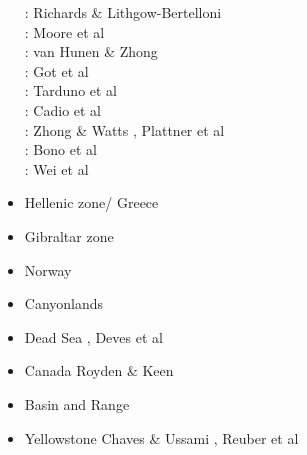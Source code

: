 \begin{itemize}
\begin{scriptsize}
\nineteenninetysix: Richards \& Lithgow-Bertelloni \cite{rili96}\\
\nineteenninetyeight: Moore et al \cite{most98}\\
\twothousandthree: van Hunen \& Zhong \cite{vazh03}\\
\twothousandeight: Got et al \cite{gomm08}\\
\twothousandnine: Tarduno et al \cite{tabs09}\\
\twothousandtwelve: Cadio et al \cite{cabp12}\\
\twothousandthirteen: Zhong \& Watts \cite{zhwa13}, Plattner et al \cite{plab13}\\
\twothousandnineteen: Bono et al \cite{botb19}\\
\twothousandtwenty: Wei et al \cite{wesl20}
\end{scriptsize}

\item Hellenic zone/ Greece  
{\scriptsize
\cite{spwv88}
\cite{guhf13}
\cite{olpr14}
}
\item Gibraltar zone 
{\scriptsize
\cite{gumr02}\cite{nebs02}
\cite{vanv08}
\cite{fufa10}
\cite{miab13}\cite{almb13}
\cite{medd15}\cite{furc15}
\cite{necf16}
\cite{casv19}
\cite{jitf19}
} 
\item Norway 
{\scriptsize
\cite{soma13}
\cite{bubj15}
}
\item Canyonlands 
{\scriptsize
\cite{trca94}
\cite{scwa02}
\cite{grsk03}
}
\item Dead Sea 
{\scriptsize
\cite{sopg05},
Deves et al \cite{dekk11}
}
\item Canada 
{\scriptsize
Royden \& Keen \cite{roke80}
\cite{brbw93}
\cite{pelj99}
}
\item Basin and Range 
{\scriptsize
\cite{brbe89c}
\cite{wefr09}
}
\item Yellowstone 
{\scriptsize
Chaves \& Ussami \cite{chus13},
Reuber et al \cite{rekp18}
}


\end{itemize}
